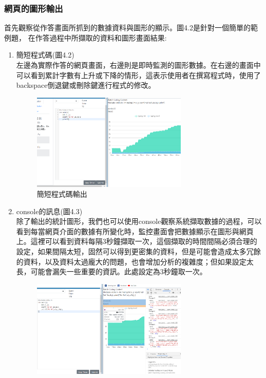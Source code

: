 \subsubsection{網頁的圖形輸出}
首先觀察從作答畫面所抓到的數據資料與圖形的顯示。圖4.2是針對一個簡單的範例題，
在作答過程中所擷取的資料和圖形畫面結果:
\begin{enumerate}[1.]
	\item 簡短程式碼(圖4.2)\\
	左邊為實際作答的網頁畫面，右邊則是即時監測的圖形數據。在右邊的畫面中可以看到累計字數有上升或下降的情形，這表示使用者在撰寫程式時，使用了backspace倒退鍵或刪除鍵進行程式的修改。
	\begin{figure}[H] 
		\centering 
		\includegraphics[width=0.7\textwidth]{4_2.png} 
		\caption{簡短程式碼輸出} 
		\label{Fig.4.2} 
	\end{figure}
	\item console的訊息(圖4.3)\\
	除了輸出的統計圖形，我們也可以使用console觀察系統擷取數據的過程，可以看到每當網頁介面的數據有所變化時，監控畫面會把數據顯示在圖形與網頁上。這裡可以看到資料每隔3秒鐘擷取一次，這個擷取的時間間隔必須合理的設定，如果間隔太短，固然可以得到更密集的資料，但是可能會造成太多冗餘的資料，以及資料太過龐大的問題，也會增加分析的複雜度；但如果設定太長，可能會漏失一些重要的資訊。此處設定為3秒鐘取一次。
	\begin{figure}[H] 
		\centering 
		\includegraphics[width=0.7\textwidth]{4_3.png} 

\end{figure}
\end{enumerate}
